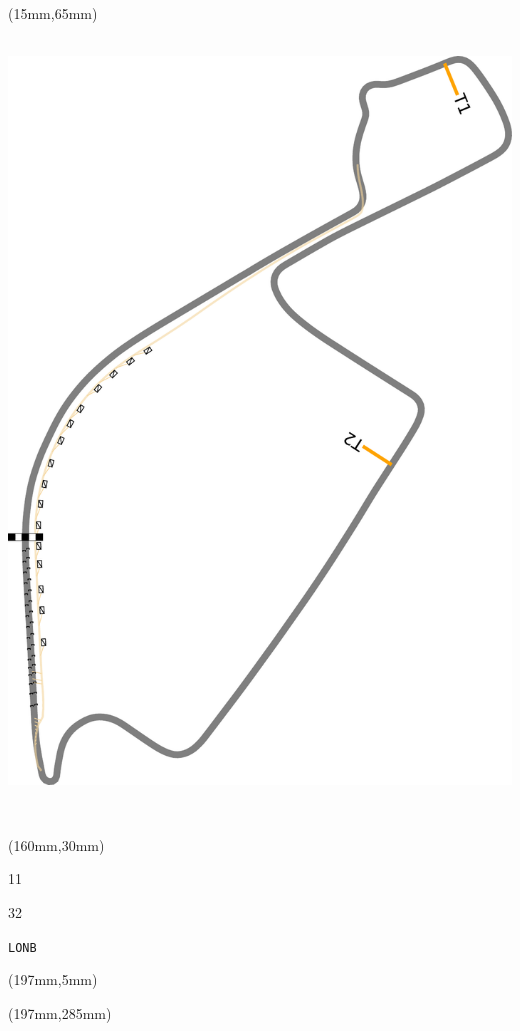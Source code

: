 \begin{textblock*}{185mm}(15mm,65mm)%
\centering
\mbox{\includegraphics[width=185mm,height=210mm,keepaspectratio]{PT/LONB.pdf}}
\end{textblock*}
\begin{textblock*}{40mm}(160mm,30mm)%
\Large
\par{} 
\par11 
\par32 
\par\hfill\tiny\tt LONB\\
\end{textblock*}
\begin{textblock*}{20mm}(197mm,5mm)%
\fbox{\thepage}
\label{LONB}
\end{textblock*}
\begin{textblock*}{20mm}(197mm,285mm)%
\fbox{\thepage}
\end{textblock*}

